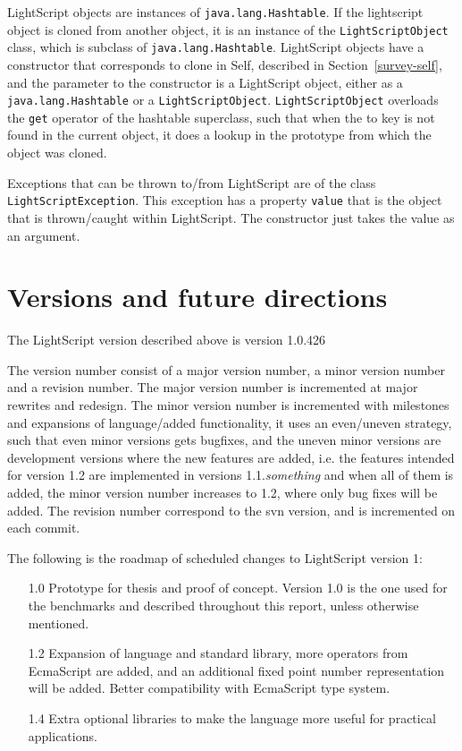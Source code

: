 \documentclass[11pt]{report}
\begin{document}
LightScript objects are instances of \verb|java.lang.Hashtable|. If the lightscript object is cloned from another object, it is an instance of the \verb|LightScriptObject| class, which is subclass of \verb|java.lang.Hashtable|. LightScript objects have a constructor that corresponds to clone in Self, described in Section~\ref{survey-self}, and the parameter to the constructor is a LightScript object, either as a \verb|java.lang.Hashtable| or a \verb|LightScriptObject|. \verb|LightScriptObject| overloads the \verb|get| operator of the hashtable superclass, such that when the to key is not found in the current object, it does a lookup in the prototype from which the object was cloned.

Exceptions that can be thrown to/from LightScript are of the class \verb|LightScriptException|. This exception has a property \verb|value| that is the object that is thrown/caught within LightScript. The constructor just takes the value as an argument.

\section{Versions and future directions}
The LightScript version described above is version 1.0.426

The version number consist of a major version number, a minor version number and a revision number.
The major version number is incremented at major rewrites and redesign.
The minor version number is incremented with milestones and expansions of language/added functionality, it uses an even/uneven strategy, such that even minor versions gets bugfixes, and the uneven minor versions are development versions where the new features are added, i.e. 
the features intended for version 1.2 are implemented in versions 1.1.\emph{something} and when all of them is added, the minor version number increases to 1.2, where only bug fixes will be added.
The revision number correspond to the svn version, and is incremented on each commit.

The following is the roadmap of scheduled changes to LightScript version 1:
\begin{itemize}
\item[1.0]
Prototype for thesis and proof of concept.
Version 1.0 is the one used for the benchmarks and described throughout this report, unless otherwise mentioned. 
\item[1.2]
Expansion of language and standard library, more operators from EcmaScript are added,
and an additional fixed point number representation will be added. Better compatibility with EcmaScript type system.
\item[1.4]
Extra optional libraries to make the language more useful for practical applications.
\end{itemize}
\end{document}
